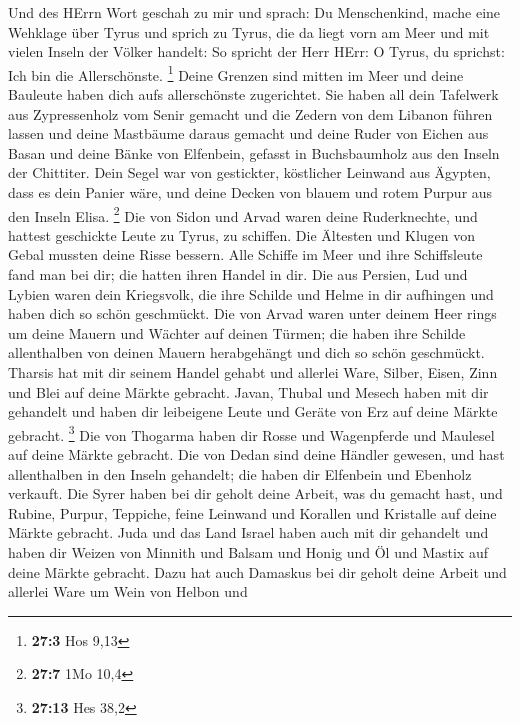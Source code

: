  Und des HErrn Wort geschah zu mir und sprach:
 Du Menschenkind, mache eine Wehklage über Tyrus
 und sprich zu Tyrus, die da liegt vorn am Meer und mit
vielen Inseln der Völker handelt: So spricht der Herr HErr: O Tyrus, du
sprichst: Ich bin die Allerschönste. \footnote{\textbf{27:3} Hos 9,13}
 Deine Grenzen sind mitten im Meer und deine Bauleute
haben dich aufs allerschönste zugerichtet.  Sie haben all
dein Tafelwerk aus Zypressenholz vom Senir gemacht und die Zedern von
dem Libanon führen lassen und deine Mastbäume daraus gemacht
 und deine Ruder von Eichen aus Basan und deine Bänke von
Elfenbein, gefasst in Buchsbaumholz aus den Inseln der Chittiter.
 Dein Segel war von gestickter, köstlicher Leinwand aus
Ägypten, dass es dein Panier wäre, und deine Decken von blauem und rotem
Purpur aus den Inseln Elisa. \footnote{\textbf{27:7} 1Mo 10,4}
 Die von Sidon und Arvad waren deine Ruderknechte, und
hattest geschickte Leute zu Tyrus, zu schiffen.  Die
Ältesten und Klugen von Gebal mussten deine Risse bessern. Alle Schiffe
im Meer und ihre Schiffsleute fand man bei dir; die hatten ihren Handel
in dir.  Die aus Persien, Lud und Lybien waren dein
Kriegsvolk, die ihre Schilde und Helme in dir aufhingen und haben dich
so schön geschmückt.  Die von Arvad waren unter deinem
Heer rings um deine Mauern und Wächter auf deinen Türmen; die haben ihre
Schilde allenthalben von deinen Mauern herabgehängt und dich so schön
geschmückt.  Tharsis hat mit dir seinem Handel gehabt und
allerlei Ware, Silber, Eisen, Zinn und Blei auf deine Märkte gebracht.
 Javan, Thubal und Mesech haben mit dir gehandelt und
haben dir leibeigene Leute und Geräte von Erz auf deine Märkte gebracht.
\footnote{\textbf{27:13} Hes 38,2}  Die von Thogarma
haben dir Rosse und Wagenpferde und Maulesel auf deine Märkte gebracht.
 Die von Dedan sind deine Händler gewesen, und hast
allenthalben in den Inseln gehandelt; die haben dir Elfenbein und
Ebenholz verkauft.  Die Syrer haben bei dir geholt deine
Arbeit, was du gemacht hast, und Rubine, Purpur, Teppiche, feine
Leinwand und Korallen und Kristalle auf deine Märkte gebracht.
 Juda und das Land Israel haben auch mit dir gehandelt
und haben dir Weizen von Minnith und Balsam und Honig und Öl und Mastix
auf deine Märkte gebracht.  Dazu hat auch Damaskus bei
dir geholt deine Arbeit und allerlei Ware um Wein von Helbon und
